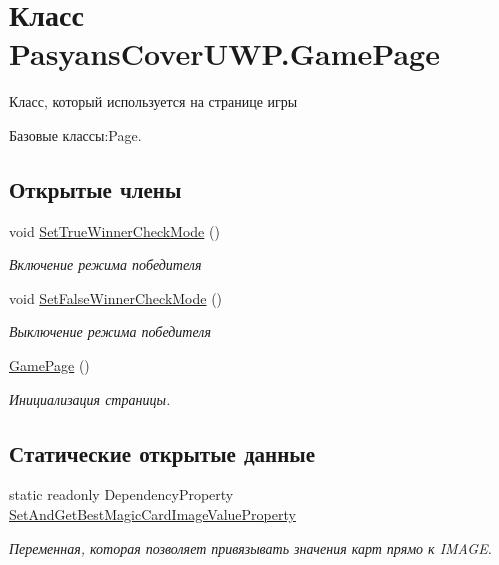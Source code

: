 \hypertarget{class_pasyans_cover_u_w_p_1_1_game_page}{}\section{Класс Pasyans\+Cover\+U\+W\+P.\+Game\+Page}
\label{class_pasyans_cover_u_w_p_1_1_game_page}


Класс, который используется на странице игры  




Базовые классы\+:Page.

\subsection*{Открытые члены}
\begin{DoxyCompactItemize}
\item 
void \hyperlink{class_pasyans_cover_u_w_p_1_1_game_page_a321f58ca276bdbc44b53589d75206a75}{Set\+True\+Winner\+Check\+Mode} ()
\begin{DoxyCompactList}\small\item\em Включение режима победителя \end{DoxyCompactList}\item 
void \hyperlink{class_pasyans_cover_u_w_p_1_1_game_page_a4de163f8a87e5dac6f4ef06360cdaa40}{Set\+False\+Winner\+Check\+Mode} ()
\begin{DoxyCompactList}\small\item\em Выключение режима победителя \end{DoxyCompactList}\item 
\hyperlink{class_pasyans_cover_u_w_p_1_1_game_page_ae93f35d902ec5fbb566632b0dc5e0b59}{Game\+Page} ()
\begin{DoxyCompactList}\small\item\em Инициализация страницы. \end{DoxyCompactList}\end{DoxyCompactItemize}
\subsection*{Статические открытые данные}
\begin{DoxyCompactItemize}
\item 
static readonly Dependency\+Property \hyperlink{class_pasyans_cover_u_w_p_1_1_game_page_aeb2b54ad9c536fab826a7a7f1447f3da}{Set\+And\+Get\+Best\+Magic\+Card\+Image\+Value\+Property}
\begin{DoxyCompactList}\small\item\em Переменная, которая позволяет привязывать значения карт прямо к I\+M\+A\+GE. \end{DoxyCompactList}\end{DoxyCompactItemize}

